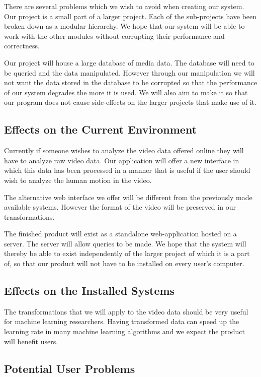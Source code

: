 \documentclass{scrreprt}
\begin{document}
{There are several problems which we wish to avoid when creating our
system. Our project is a small part of a larger project. Each of the
sub-projects have been broken down as a modular hierarchy. We hope that
our system will be able to work with the other modules without
corrupting their performance and correctness.}

{Our project will house a large database of media data. The database
will need to be queried and the data manipulated. However through our
manipulation we will not want the data stored in the database to be
corrupted so that the performance of our system degrades the more it is
used. We will also aim to make it so that our program does not cause
side-effects on the larger projects that make use of it.}

\subsection{Effects on the Current Environment}

{Currently if someone wishes to analyze the video data offered online
they will have to analyze raw video data. Our application will offer a
new interface in which this data has been processed in a manner that is
useful if the user should wish to analyze the human motion in the
video.}

{The alternative web interface we offer will be different from the previously
made available systems. However the format of the video will be preserved in
our transformations.}

{The finished product will exist as a standalone web-application hosted on a
server. The server will allow queries to be made. We hope that the system
will thereby be able to exist independently of the larger project of which it
is a part of, so that our product will not have to be installed on every user's
computer.}

\subsection{Effects on the Installed Systems}

{The transformations that we will apply to the video data should be very
useful for machine learning researchers. Having transformed data can
speed up the learning rate in many machine learning algorithms and we
expect the product will benefit users.}

\subsection{Potential User Problems}
\end{document}
